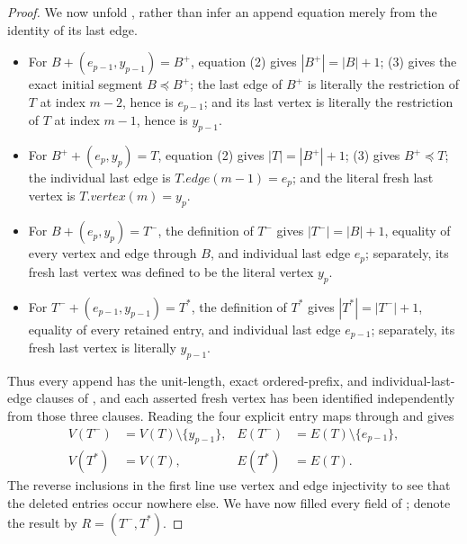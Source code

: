 \begin{proof}
We now unfold , rather than infer an
append equation merely from the identity of its last edge.
\begin{itemize}
\item For \(B+(e_{p-1},y_{p-1})=B^+\), equation (2) gives
\(|B^+|=|B|+1\); (3) gives the exact initial segment \(B\preccurlyeq B^+\);
the last edge of \(B^+\) is literally the restriction of \(T\) at index
\(m-2\), hence is \(e_{p-1}\); and its last vertex is literally the
restriction of \(T\) at index \(m-1\), hence is \(y_{p-1}\).
\item For \(B^++(e_p,y_p)=T\), equation (2) gives
\(|T|=|B^+|+1\); (3) gives \(B^+\preccurlyeq T\); the individual last
edge is \(T.\mathit{edge}(m-1)=e_p\); and the literal fresh last vertex is
\(T.\mathit{vertex}(m)=y_p\).
\item For \(B+(e_p,y_p)=T^-\), the definition of \(T^-\) gives
\(|T^-|=|B|+1\), equality of every vertex and edge through \(B\), and
individual last edge \(e_p\); separately, its fresh last vertex was
defined to be the literal vertex \(y_p\).
\item For \(T^-+(e_{p-1},y_{p-1})=T^*\), the definition of \(T^*\)
gives \(|T^*|=|T^-|+1\), equality of every retained entry, and individual
last edge \(e_{p-1}\); separately, its fresh last vertex is literally
\(y_{p-1}\).
\end{itemize}
Thus every append has the unit-length, exact ordered-prefix, and
individual-last-edge clauses of , and
each asserted fresh vertex has been identified independently from those
three clauses.  Reading the four explicit entry maps through
 and  gives
\[
\begin{aligned}
 V(T^-)&=V(T)\setminus\{y_{p-1}\},&
 E(T^-)&=E(T)\setminus\{e_{p-1}\},\\
 V(T^*)&=V(T),& E(T^*)&=E(T).
\end{aligned}                                                 \tag{6}
\]
The reverse inclusions in the first line use vertex and edge injectivity
to see that the deleted entries occur nowhere else.  We have now filled
every field of ; denote the
result by \(R=(T^-,T^*)\).


\end{proof}

